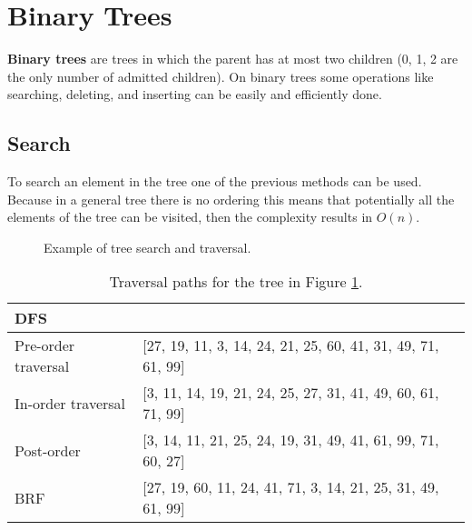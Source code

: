 \section{Binary Trees}
\textbf{Binary trees} are trees in which the parent has at most two children (0, 1, 2 are the only number of admitted children). On binary trees some operations like searching, deleting, and inserting can be easily and efficiently done. 
\subsection{Search}
To search an element in the tree one of the previous methods can be used. Because in a general tree there is no ordering this means that potentially all the elements of the tree can be visited, then the complexity results in \(O(n)\).

\begin{figure}[H]
\centering
{}
\caption[Example of tree search and traversal.]{Example of tree search and traversal.}
\label{trees_12}
\end{figure}

\begin{table}[H]
	\centering
	\begin{tabular}{l  l}
 		 DFS & \\
		\hline
		Pre-order traversal & [27, 19, 11, 3, 14, 24, 21, 25, 60, 41, 31, 49, 71, 61, 99] \\
		In-order traversal & [3, 11, 14, 19, 21, 24, 25, 27, 31, 41, 49, 60, 61, 71, 99] \\
		Post-order & [3, 14, 11, 21, 25, 24, 19, 31, 49, 41, 61, 99, 71, 60, 27] \\
		\hline
		BRF & [27, 19, 60, 11, 24, 41, 71, 3, 14, 21, 25, 31, 49, 61, 99]
	\end{tabular}
\caption[Traversal paths for the tree in Figure \ref{trees_12}.]{Traversal paths for the tree in Figure \ref{trees_12}.}
\end{table}

